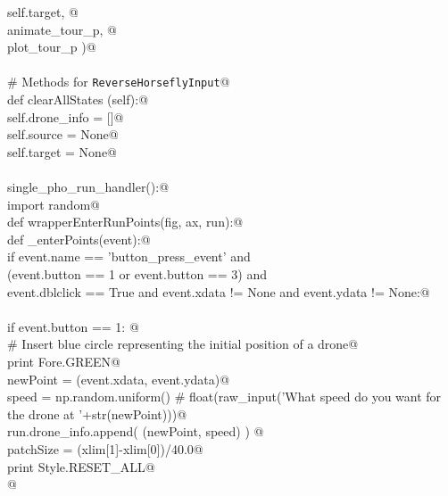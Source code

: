 \documentclass[12pt, english, oneside]{report}
\begin{document}
\begin{appendices}
\begin{flushleft}
\begin{list}{}{}
\mbox{}\verb@                        self.target, @\\
\mbox{}\verb@                        animate_tour_p, @\\
\mbox{}\verb@                        plot_tour_p    )@\\
\mbox{}\verb@@\\
\mbox{}\verb@    # Methods for \verb|ReverseHorseflyInput|@\\
\mbox{}\verb@    def clearAllStates (self):@\\
\mbox{}\verb@          self.drone_info = []@\\
\mbox{}\verb@          self.source = None@\\
\mbox{}\verb@          self.target = None@\\
\mbox{}\verb@@\\
\mbox{}\verb@def single_pho_run_handler():@\\
\mbox{}\verb@    import random@\\
\mbox{}\verb@    def wrapperEnterRunPoints(fig, ax, run):@\\
\mbox{}\verb@      def _enterPoints(event):@\\
\mbox{}\verb@        if event.name      == 'button_press_event'          and \@\\
\mbox{}\verb@           (event.button   == 1 or event.button == 3)       and \@\\
\mbox{}\verb@            event.dblclick == True and event.xdata  != None and event.ydata  != None:@\\
\mbox{}\verb@@\\
\mbox{}\verb@             if event.button == 1:  @\\
\mbox{}\verb@                 # Insert blue circle representing the initial position of a drone@\\
\mbox{}\verb@                 print Fore.GREEN@\\
\mbox{}\verb@                 newPoint = (event.xdata, event.ydata)@\\
\mbox{}\verb@                 speed    = np.random.uniform() # float(raw_input('What speed do you want for the drone at '+str(newPoint)))@\\
\mbox{}\verb@                 run.drone_info.append( (newPoint, speed) ) @\\
\mbox{}\verb@                 patchSize  = (xlim[1]-xlim[0])/40.0@\\
\mbox{}\verb@                 print Style.RESET_ALL@\\
\mbox{}\verb@                 @\\

\end{list}
\end{flushleft}
\end{appendices}
\end{document}
